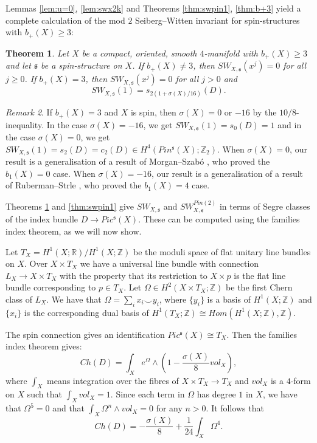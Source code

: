 \documentclass{amsart}
\newtheorem{theorem}{Theorem}[section]
\theoremstyle{definition}
\theoremstyle{remark}
\newtheorem{remark}[theorem]{Remark}
\numberwithin{equation}{section}
\begin{document}
Lemmas \ref{lem:u=0}, \ref{lem:swx2k} and Theorems \ref{thm:swpin1}, \ref{thm:b+3} yield a complete calculation of the mod $2$ Seiberg--Witten invariant for spin-structures with $b_+(X) \ge 3$:

\begin{theorem}\label{thm:swspin1}
Let $X$ be a compact, oriented, smooth $4$-manifold with $b_+(X) \ge 3$ and let $\mathfrak{s}$ be a spin-structure on $X$. If $b_+(X) \neq 3$, then $SW_{X,\mathfrak{s}}(x^j) = 0$ for all $j \ge 0$. If $b_+(X) = 3$, then $SW_{X,\mathfrak{s}}(x^j) = 0$ for all $j > 0$ and
\[
SW_{X,\mathfrak{s}}( 1 ) = s_{2(1+\sigma(X)/16)}(D).
\]
\end{theorem}

\begin{remark}
If $b_+(X) = 3$ and $X$ is spin, then $\sigma(X) = 0$ or $-16$ by the $10/8$-inequality. In the case $\sigma(X) = -16$, we get $SW_{X,\mathfrak{s}}(1) = s_0(D) = 1$ and in the case $\sigma(X)=0$, we get $SW_{X,\mathfrak{s}}(1) = s_2(D) = c_2(D) \in H^4( Pin^{\mathfrak{s}}(X) ; \mathbb{Z}_2)$. When $\sigma(X)=0$, our result is a generalisation of a result of Morgan--Szab\'o \cite{ms}, who proved the $b_1(X) = 0$ case. When $\sigma(X) = -16$, our result is a generalisation of a result of Ruberman--Strle \cite{rs}, who proved the $b_1(X) = 4$ case.
\end{remark}

Theorems \ref{thm:swspin1} and \ref{thm:swpin1} give $SW_{X,\mathfrak{s}}$ and $SW^{Pin(2)}_{X,\mathfrak{s}}$ in terms of Segre classes of the index bundle $D \to Pic^{\mathfrak{s}}(X)$. These can be computed using the families index theorem, as we will now show.

Let $T_X = H^1(X ; \mathbb{R})/H^1(X ; \mathbb{Z})$ be the moduli space of flat unitary line bundles on $X$. Over $X \times T_X$ we have a universal line bundle with connection $L_X \to X \times T_X$ with the property that its restriction to $X \times {p}$ is the flat line bundle corresponding to $p \in T_X$. Let $\Omega \in H^2(X \times T_X ; \mathbb{Z})$ be the first Chern class of $L_X$. We have that $\Omega = \sum_i x_i \! \smallsmile \! y_i $, where $\{ y_i \}$ is a basis of $H^1(X ; \mathbb{Z})$ and $\{ x_i \}$ is the corresponding dual basis of $H^1( T_X ; \mathbb{Z}) \cong Hom( H^1(X ; \mathbb{Z}) , \mathbb{Z})$. 

The spin connection gives an identification $Pic^{\mathfrak{s}}(X) \cong T_X$. Then the families index theorem gives:
\[
Ch(D) = \int_{X} e^{\Omega } \wedge \left( 1 - \frac{\sigma(X)}{8} vol_X \right),
\]
where $\int_{X}$ means integration over the fibres of $X \times T_X \to T_X$ and $vol_X$ is a $4$-form on $X$ such that $\int_X vol_X = 1$. Since each term in $\Omega$ has degree $1$ in $X$, we have that $\Omega^5 = 0$ and that $\int_X \Omega^n \wedge vol_X = 0$ for any $n > 0$. It follows that
\[
Ch(D) = -\frac{\sigma(X)}{8} + \frac{1}{24} \int_X \Omega^4.
\]
\end{document}
